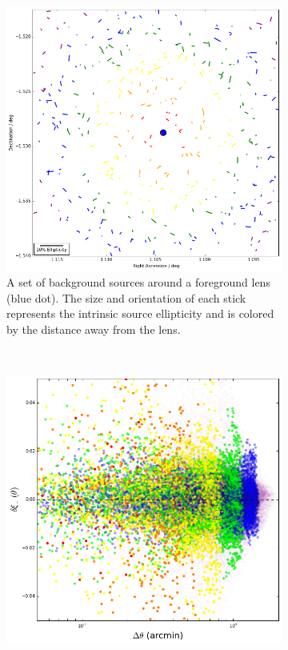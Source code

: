 \documentclass[%
 reprint,
 amsmath,amssymb,
 aps,nofootinbib
]{revtex4-1}
\begin{document}
\begin{figure}
    \centering
    \begin{subfigure}{0.45\textwidth}
        \includegraphics[width=\textwidth]{figs-swe/corr_visualization_unlensed.png}
        \captionsetup{justification=raggedright,singlelinecheck=false}
        \caption{A set of background sources around a foreground lens (blue dot). The size and orientation of each stick represents the intrinsic source ellipticity and is colored by the distance away from the lens.}
        \label{color_corr_unlensed}
    \end{subfigure}
    ~
    \begin{subfigure}{0.45\textwidth}
        \includegraphics[width=\textwidth]{figs-swe/corr_dist_unlensed.png}

\end{subfigure}
\end{figure}
\end{document}
